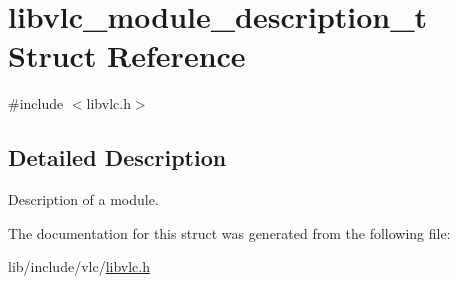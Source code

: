\hypertarget{structlibvlc__module__description__t}{}\section{libvlc\+\_\+module\+\_\+description\+\_\+t Struct Reference}
\label{structlibvlc__module__description__t}


{\ttfamily \#include $<$libvlc.\+h$>$}



\subsection{Detailed Description}
Description of a module. 

The documentation for this struct was generated from the following file\+:\begin{DoxyCompactItemize}
\item 
lib/include/vlc/\hyperlink{libvlc_8h}{libvlc.\+h}\end{DoxyCompactItemize}
